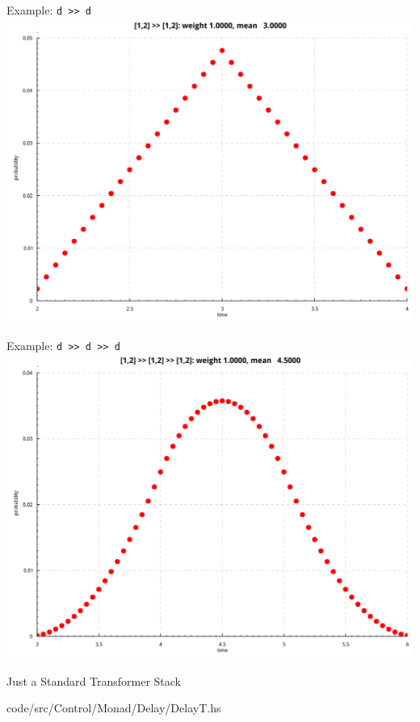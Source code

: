 ﻿\documentclass[aspectratio=169]{beamer}
\begin{document}
\begin{frame}{Example: \tt d >> d}
    \centering
    \includegraphics[height=0.8\textheight]{images/d_d.png}
\end{frame}

\begin{frame}{Example: \tt d >> d >> d}
    \centering
    \includegraphics[height=0.8\textheight]{images/d_d_d.png}
\end{frame}

\begin{frame}{Just a Standard Transformer Stack}
    
        {code/src/Control/Monad/Delay/DelayT.hs}
\end{frame}
\end{document}
